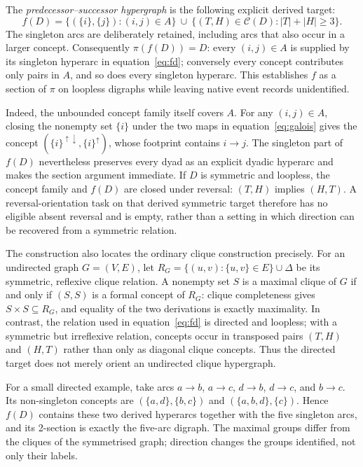 \documentclass[10pt]{article}
\begin{document}
The \emph{predecessor--successor hypergraph} is the following explicit derived target:
\begin{equation}
 f(D)=\{(\{i\},\{j\}):(i,j)\in A\}\ \cup\
 \{(T,H)\in\mathcal C(D):|T|+|H|\ge3\}.
 \label{eq:fd}
\end{equation}
The singleton arcs are deliberately retained, including arcs that also occur in a larger concept.  Consequently $\pi(f(D))=D$: every $(i,j)\in A$ is supplied by its singleton hyperarc in equation~\eqref{eq:fd}; conversely every concept contributes only pairs in $A$, and so does every singleton hyperarc.  This establishes $f$ as a section of $\pi$ on loopless digraphs while leaving native event records unidentified.

Indeed, the unbounded concept family itself covers $A$. For any $(i,j)\in A$, closing the nonempty set $\{i\}$ under the two maps in equation~\eqref{eq:galois} gives the concept $(\{i\}^{\uparrow\downarrow},\{i\}^{\uparrow})$, whose footprint contains $i\to j$. The singleton part of $f(D)$ nevertheless preserves every dyad as an explicit dyadic hyperarc and makes the section argument immediate. If $D$ is symmetric and loopless, the concept family and $f(D)$ are closed under reversal: $(T,H)$ implies $(H,T)$. A reversal-orientation task on that derived symmetric target therefore has no eligible absent reversal and is empty, rather than a setting in which direction can be recovered from a symmetric relation.

The construction also locates the ordinary clique construction precisely.  For an undirected graph $G=(V,E)$, let $R_G=\{(u,v):\{u,v\}\in E\}\cup\Delta$ be its symmetric, reflexive clique relation.  A nonempty set $S$ is a maximal clique of $G$ if and only if $(S,S)$ is a formal concept of $R_G$: clique completeness gives $S\times S\subseteq R_G$, and equality of the two derivations is exactly maximality.  In contrast, the relation used in equation~\eqref{eq:fd} is directed and loopless; with a symmetric but irreflexive relation, concepts occur in transposed pairs $(T,H)$ and $(H,T)$ rather than only as diagonal clique concepts.  Thus the directed target does not merely orient an undirected clique hypergraph.

For a small directed example, take arcs $a\to b$, $a\to c$, $d\to b$, $d\to c$, and $b\to c$.  Its non-singleton concepts are $(\{a,d\},\{b,c\})$ and $(\{a,b,d\},\{c\})$.  Hence $f(D)$ contains these two derived hyperarcs together with the five singleton arcs, and its 2-section is exactly the five-arc digraph.  The maximal groups differ from the cliques of the symmetrised graph; direction changes the groups identified, not only their labels.
\end{document}
